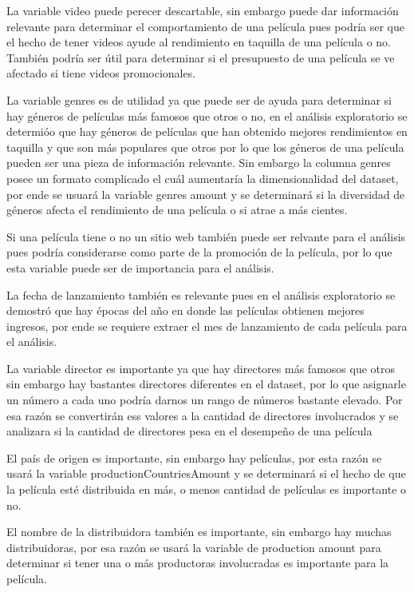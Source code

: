 \documentclass[
]{article}
\begin{document}
La variable video puede perecer descartable, sin embargo puede dar
información relevante para determinar el comportamiento de una película
pues podría ser que el hecho de tener videos ayude al rendimiento en
taquilla de una película o no. También podría ser útil para determinar
si el presupuesto de una película se ve afectado si tiene videos
promocionales.

La variable genres es de utilidad ya que puede ser de ayuda para
determinar si hay géneros de películas más famosos que otros o no, en el
análisis exploratorio se determióo que hay géneros de películas que han
obtenido mejores rendimientos en taquilla y que son más populares que
otros por lo que los géneros de una película pueden ser una pieza de
información relevante. Sin embargo la columna genres posee un formato
complicado el cuál aumentaría la dimensionalidad del dataset, por ende
se usuará la variable genres amount y se determinará si la diversidad de
géneros afecta el rendimiento de una película o si atrae a más cientes.

Si una película tiene o no un sitio web también puede ser relvante para
el análisis pues podría considerarse como parte de la promoción de la
película, por lo que esta variable puede ser de importancia para el
análisis.

La fecha de lanzamiento también es relevante pues en el análisis
exploratorio se demostró que hay épocas del año en donde las películas
obtienen mejores ingresos, por ende se requiere extraer el mes de
lanzamiento de cada película para el análisis.

La variable director es importante ya que hay directores más famosos que
otros sin embargo hay bastantes directores diferentes en el dataset, por
lo que asignarle un número a cada uno podría darnos un rango de números
bastante elevado. Por esa razón se convertirán ess valores a la cantidad
de directores involucrados y se analizara si la cantidad de directores
pesa en el desempeño de una película

El país de origen es importante, sin embargo hay películas, por esta
razón se usará la variable productionCountriesAmount y se determinará si
el hecho de que la película esté distribuida en más, o menos cantidad de
películas es importante o no.

El nombre de la distribuidora también es importante, sin embargo hay
muchas distribuidoras, por esa razón se usará la variable de production
amount para determinar si tener una o más productoras involucradas es
importante para la película.
\end{document}
